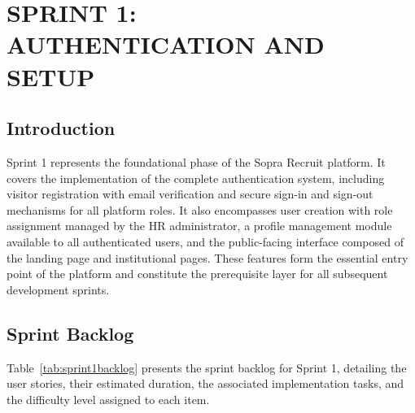 ﻿\chapter[SPRINT 1: AUTHENTICATION AND SETUP]{SPRINT 1:\\ AUTHENTICATION AND SETUP}
\thispagestyle{MyStyle}
\minitoc
\newpage
\thispagestyle{MyStyle}

\section*{Introduction}

Sprint 1 represents the foundational phase of the Sopra Recruit platform. It covers the implementation of the complete authentication system, including visitor registration with email verification and secure sign-in and sign-out mechanisms for all platform roles. It also encompasses user creation with role assignment managed by the HR administrator, a profile management module available to all authenticated users, and the public-facing interface composed of the landing page and institutional pages. These features form the essential entry point of the platform and constitute the prerequisite layer for all subsequent development sprints.

\section{Sprint Backlog}

Table~\ref{tab:sprint1backlog} presents the sprint backlog for Sprint 1, detailing the user stories, their estimated duration, the associated implementation tasks, and the difficulty level assigned to each item.

